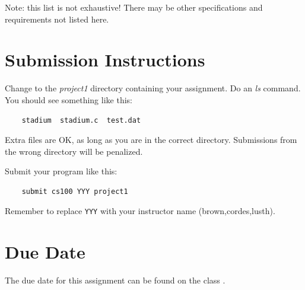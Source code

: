 \documentclass[12pt]{article}
\begin{document}
Note: this list is not exhaustive! There may be other specifications
and requirements not listed here.

\section*{Submission Instructions}

Change to the {\it project1} directory containing your assignment.  Do an
{\it ls} command. You should see something like this:

\begin{verbatim}
    stadium  stadium.c  test.dat
\end{verbatim}

Extra files are OK, as long as you are in the correct directory. 
Submissions from the wrong directory will be penalized.

Submit your program like this:

\begin{verbatim}
    submit cs100 YYY project1
\end{verbatim}

Remember to replace \verb!YYY! with your instructor name
(brown,cordes,lusth).

\section*{Due Date}

The due date for this assignment can be found on the class
.
\end{document}
